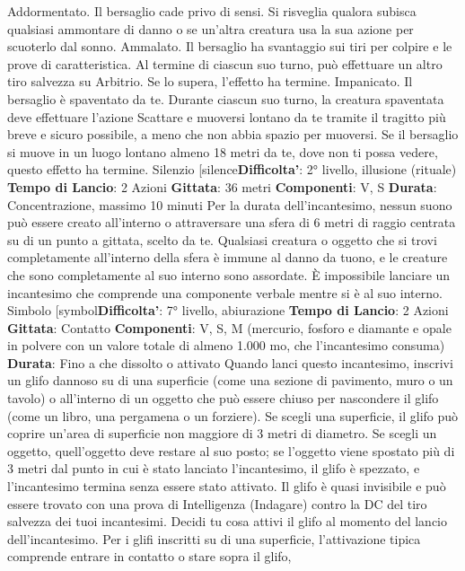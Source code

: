 \begin{multicols}{2}
Addormentato. Il bersaglio cade privo di sensi. Si
risveglia qualora subisca qualsiasi ammontare di danno
o se un’altra creatura usa la sua azione per scuoterlo
dal sonno.
Ammalato. Il bersaglio ha svantaggio sui tiri per colpire
e le prove di caratteristica. Al termine di ciascun suo
turno, può effettuare un altro tiro salvezza su Arbitrio.
Se lo supera, l’effetto ha termine.
Impanicato. Il bersaglio è spaventato da te. Durante
ciascun suo turno, la creatura spaventata deve
effettuare l’azione Scattare e muoversi lontano da te
tramite il tragitto più breve e sicuro possibile, a meno
che non abbia spazio per muoversi. Se il bersaglio si
muove in un luogo lontano almeno 18 metri da te, dove
non ti possa vedere, questo effetto ha termine.
Silenzio
[silence\textbf{Difficolta'}:
2° livello, illusione (rituale)
\textbf{Tempo di Lancio}: 2 Azioni
\textbf{Gittata}: 36 metri
\textbf{Componenti}: V, S
\textbf{Durata}: Concentrazione, massimo 10 minuti
Per la durata dell’incantesimo, nessun suono può
essere creato all’interno o attraversare una sfera di 6
metri di raggio centrata su di un punto a gittata, scelto
da te. Qualsiasi creatura o oggetto che si trovi
completamente all’interno della sfera è immune al
danno da tuono, e le creature che sono completamente
al suo interno sono assordate. È impossibile lanciare un
incantesimo che comprende una componente verbale
mentre si è al suo interno.
Simbolo
[symbol\textbf{Difficolta'}:
7° livello, abiurazione
\textbf{Tempo di Lancio}: 2 Azioni
\textbf{Gittata}: Contatto
\textbf{Componenti}: V, S, M (mercurio, fosforo e diamante e
opale in polvere con un valore totale di almeno 1.000
mo, che l’incantesimo consuma)
\textbf{Durata}: Fino a che dissolto o attivato
Quando lanci questo incantesimo, inscrivi un glifo
dannoso su di una superficie (come una sezione di
pavimento, muro o un tavolo) o all’interno di un oggetto
che può essere chiuso per nascondere il glifo (come un
libro, una pergamena o un forziere). Se scegli una
superficie, il glifo può coprire un’area di superficie non
maggiore di 3 metri di diametro. Se scegli un oggetto,
quell’oggetto deve restare al suo posto; se l’oggetto 
viene spostato più di 3 metri dal punto in cui è stato
lanciato l’incantesimo, il glifo è spezzato, e
l’incantesimo termina senza essere stato attivato.
Il glifo è quasi invisibile e può essere trovato con una
prova di Intelligenza (Indagare) contro la DC del tiro
salvezza dei tuoi incantesimi.
Decidi tu cosa attivi il glifo al momento del lancio
dell’incantesimo.
Per i glifi inscritti su di una superficie, l’attivazione tipica
comprende entrare in contatto o stare sopra il glifo,

\end{multicols}
